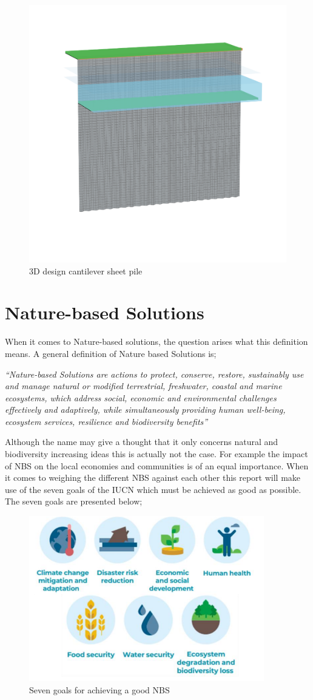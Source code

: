 \begin{figure}[H]
    \centering
    \includegraphics[width=0.70\linewidth]{figures/ch8/3D_final_desgin.png}
    \caption{3D design cantilever sheet pile}
    \label{fig:3D_final_design}
\end{figure}

\section{Nature-based Solutions}

When it comes to Nature-based solutions, the question arises what this definition means. A general definition of Nature based Solutions is;

\textit{“Nature-based Solutions are actions to protect, conserve, restore, sustainably
use and manage natural or modified terrestrial, freshwater, coastal and marine
ecosystems, which address social, economic and environmental challenges
effectively and adaptively, while simultaneously providing human well-being,
ecosystem services, resilience and biodiversity benefits” \autocite{eiselinVerenigdeNatiesStemmen2022}}

Although the name may give a thought that it only concerns natural and biodiversity increasing ideas this is actually not the case. For example the impact of NBS on the local economies and communities is of an equal importance. When it comes to weighing the different NBS against each other this report will make use of the seven goals of the IUCN which must be achieved as good as possible. The seven goals are presented below;

\begin{figure}[H]
    \centering
    \includegraphics[width=0.50\linewidth]{figures/ThesevenNBSgoals.png}
    \caption{Seven goals for achieving a good NBS \autocite{dunlopEvolutionFutureResearch}}
    \label{fig:7g}
\end{figure}

